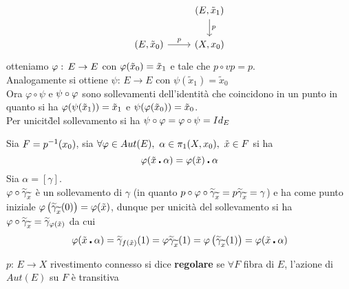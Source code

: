 \begin{thm}
\begin{itemize}
$$\begin{tikzcd}
& (E, \tilde{x}_1) \arrow[d,"p"]\\
(E, \tilde{x}_0) \arrow[r,"p"] & (X, x_0)
\end{tikzcd}$$
otteniamo $\varphi:\, E \to E$ con $\varphi(\tilde{x}_0)=\tilde{x}_1$ e tale che $p \circ vp = p $.\\
Analogamente si ottiene $\psi:\, E \to E$ con $\psi(\tilde{x}_1)=\tilde{x}_0$\\
Ora $\varphi\circ \psi $ e $\psi \circ \varphi $ sono sollevamenti dell'identit\`a che coincidono in un punto in quanto si ha 
$\varphi(\psi(\tilde{x}_1))=\tilde{x}_1$ e $\psi(\varphi(\tilde{x}_0))= \tilde{x}_0$.\\
Per unicit\` del sollevamento si ha $\psi \circ \varphi = \varphi \circ \psi = Id_E$
\end{itemize}
\endproof
\end{thm}
\begin{thm}\bianco 
Sia $F=p^{-1} (x_0)$, sia $\forall \varphi \in Aut(E),\, \, \alpha\in \pi_1(X, x_0), \, \, \tilde{x}\in F$ si ha
$$ \varphi(\tilde{x}\centerdot \alpha) = \varphi(\tilde{x}) \centerdot \alpha$$
\proof Sia $\alpha=[\gamma]$.\\
$\varphi \circ \widetilde{\gamma}_{\widetilde{x}}$ \`e un sollevamento di $\gamma$ (in quanto $p\circ \varphi \circ \widetilde{\gamma}_{\widetilde{x}} = p\widetilde{\gamma}_{\widetilde{x}} = \gamma$) e ha come punto iniziale $\varphi\left( \widetilde{\gamma}_{\widetilde{x}} (0)\right)= \varphi (\tilde{x})$, dunque per unicit\`a del sollevamento si ha $\varphi \circ \widetilde{\gamma}_{\widetilde{x}} =  \widetilde{\gamma}_{\varphi(\tilde{x})}$ da cui 
$$\varphi(\tilde{x}\centerdot \alpha)=\widetilde{\gamma}_{f(\tilde{x})}(1)=\varphi \widetilde{\gamma}_{\widetilde{x}} (1)=\varphi\left( \widetilde{\gamma}_{\widetilde{x}} (1)\right) = \varphi(\tilde{x}\centerdot \alpha)$$
\endproof
\end{thm}
\begin{defn}$p:\, E \to X$ rivestimento connesso si dice \textbf{regolare} se $\forall F$ fibra di $E$, l'azione di $Aut(E)$ su $F$ \`e transitiva
\end{defn}

